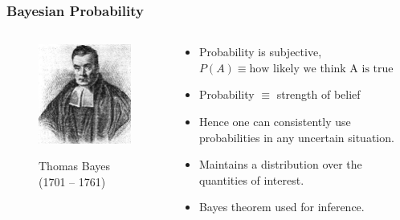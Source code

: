 \documentclass{beamer}
\begin{document}
	\begin{frame}
		\frametitle{Bayesian Probability}
		\begin{columns}
			\begin{column}{0.4\textwidth}
					\begin{figure}
					\includegraphics[scale=0.53]{bayes.jpg}
					\begin{centering}
						{\small Thomas Bayes (1701 -- 1761)}
					\end{centering}
				\end{figure}
			\end{column}	

		\begin{column}{0.6\textwidth}
			\begin{itemize}
				\item Probability is subjective, $P(A) \equiv \text{how likely we think A is true}$
				\pause
				\item Probability $\equiv$ strength of belief
				\pause
				\item Hence one can consistently use probabilities in any uncertain situation.
				\pause 
				\item Maintains a distribution over the quantities of interest.
				\pause 
				\item Bayes theorem used for inference.

 			\end{itemize}
		\end{column}
	\end{columns}
		
	\end{frame}

\end{document}
